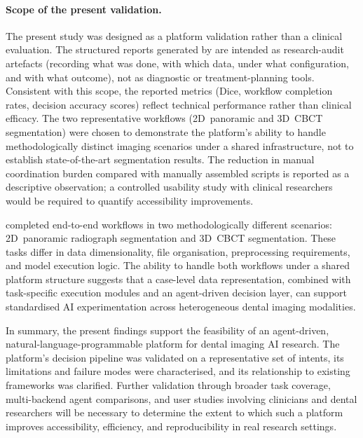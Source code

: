 \paragraph{Scope of the present validation.}
The present study was designed as a platform validation rather than a clinical
evaluation. The structured reports generated by \dentalclaw{} are intended as
research-audit artefacts (recording what was done, with which data, under what
configuration, and with what outcome), not as diagnostic or treatment-planning
tools. Consistent with this scope, the reported metrics (Dice, workflow completion
rates, decision accuracy scores) reflect technical performance rather than clinical
efficacy. The two representative workflows (2D~panoramic and 3D~CBCT segmentation)
were chosen to demonstrate the platform's ability to handle methodologically distinct
imaging scenarios under a shared infrastructure, not to establish state-of-the-art
segmentation results. The reduction in manual coordination burden compared with
manually assembled scripts is reported as a descriptive observation; a controlled
usability study with clinical researchers would be required to quantify
accessibility improvements.

\dentalclaw{} completed end-to-end workflows in two methodologically different
scenarios: 2D~panoramic radiograph segmentation and 3D~CBCT segmentation. These
tasks differ in data dimensionality, file organisation, preprocessing requirements,
and model execution logic. The ability to handle both workflows under a shared
platform structure suggests that a case-level data representation, combined with
task-specific execution modules and an agent-driven decision layer, can support
standardised AI experimentation across heterogeneous dental imaging modalities.

In summary, the present findings support the feasibility of an agent-driven,
natural-language-programmable platform for dental imaging AI research. The platform's
decision pipeline was validated on a representative set of intents, its limitations
and failure modes were characterised, and its relationship to existing frameworks
was clarified. Further validation through broader task coverage, multi-backend agent
comparisons, and user studies involving clinicians and dental researchers will be
necessary to determine the extent to which such a platform improves accessibility,
efficiency, and reproducibility in real research settings.
